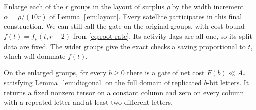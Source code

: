 Enlarge each of the \(r\) groups in the layout of surplus \(\rho\) by
the width increment \(\alpha=\rho/(10r)\) of Lemma~\ref{lem:layout}.
Every satellite participates in this final construction. We can still
call the gate on the original groups, with cost bound
\(f(t)=f_\rho(t,r-2)\) from \eqref{eq:root-rate}. Its activity flags
are all one, so its split data are fixed. The wider groups give the
exact checks a saving proportional to \(t\), which will dominate
\(f(t)\).

\begin{lemma}\label{lem:uniform-mask}
On the enlarged groups, for every \(b\ge0\) there is a gate of net
cost \(F(b)\ll A_*\) satisfying Lemma~\ref{lem:diagonal} on the full
domain of replicated \(b\)-bit letters. It returns a fixed nonzero
tensor on a constant column and zero on every column with a repeated
letter and at least two different letters.
\end{lemma}
